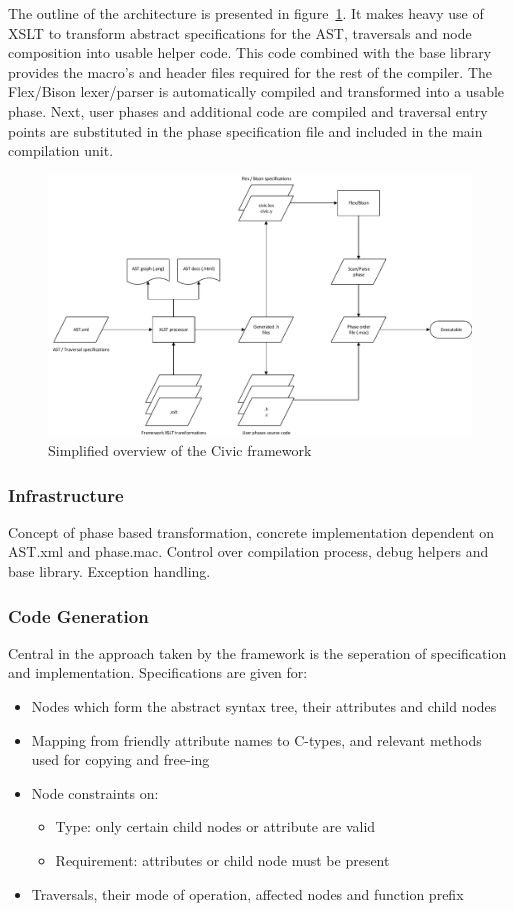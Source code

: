 \documentclass[final,a4paper,12pt]{article}
\begin{document}
The outline of the architecture is presented in figure~\ref{fig:build-dep}. It makes heavy use of XSLT to transform abstract specifications for the AST, traversals and node composition into usable helper code. This code combined with the base library provides the macro's and header files required for the rest of the compiler. The Flex/Bison lexer/parser is automatically compiled and transformed into a usable phase. Next, user phases and additional code are compiled and traversal entry points are substituted in the phase specification file and included in the main compilation unit.

\begin{figure}[H]
	\centering
	\includegraphics[scale=0.6]{figures/architecture/overview.pdf}
	\caption{Simplified overview of the Civic framework}
	\label{fig:build-dep}
\end{figure}

\subsubsection{Infrastructure}
Concept of phase based transformation, concrete implementation dependent on AST.xml and phase.mac. Control over compilation process, debug helpers and base library. Exception handling.

\subsubsection{Code Generation}
Central in the approach taken by the framework is the seperation of specification and implementation. Specifications are given for:
\begin{itemize}
	\item Nodes which form the abstract syntax tree, their attributes and child nodes
	\item Mapping from friendly attribute names to C-types, and relevant methods used for copying and free-ing
	\item Node constraints on:
	\begin{itemize}
		\item Type: only certain child nodes or attribute are valid
		\item Requirement: attributes or child node must be present
	\end{itemize}
	\item Traversals, their mode of operation, affected nodes and function prefix
\end{itemize}
\end{document}
